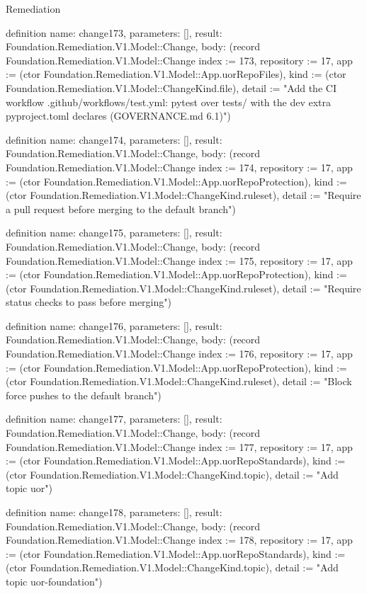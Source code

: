 \begin{lexlean}{Remediation}
\begin{semanticmodule}
definition{
  name: change173,
  parameters: [],
  result: Foundation.Remediation.V1.Model::Change,
  body: (record Foundation.Remediation.V1.Model::Change {index := 173, repository := 17, app := (ctor Foundation.Remediation.V1.Model::App.uorRepoFiles), kind := (ctor Foundation.Remediation.V1.Model::ChangeKind.file), detail := "Add the CI workflow .github/workflows/test.yml: pytest over tests/ with the dev extra pyproject.toml declares (GOVERNANCE.md 6.1)"})
}

definition{
  name: change174,
  parameters: [],
  result: Foundation.Remediation.V1.Model::Change,
  body: (record Foundation.Remediation.V1.Model::Change {index := 174, repository := 17, app := (ctor Foundation.Remediation.V1.Model::App.uorRepoProtection), kind := (ctor Foundation.Remediation.V1.Model::ChangeKind.ruleset), detail := "Require a pull request before merging to the default branch"})
}

definition{
  name: change175,
  parameters: [],
  result: Foundation.Remediation.V1.Model::Change,
  body: (record Foundation.Remediation.V1.Model::Change {index := 175, repository := 17, app := (ctor Foundation.Remediation.V1.Model::App.uorRepoProtection), kind := (ctor Foundation.Remediation.V1.Model::ChangeKind.ruleset), detail := "Require status checks to pass before merging"})
}

definition{
  name: change176,
  parameters: [],
  result: Foundation.Remediation.V1.Model::Change,
  body: (record Foundation.Remediation.V1.Model::Change {index := 176, repository := 17, app := (ctor Foundation.Remediation.V1.Model::App.uorRepoProtection), kind := (ctor Foundation.Remediation.V1.Model::ChangeKind.ruleset), detail := "Block force pushes to the default branch"})
}

definition{
  name: change177,
  parameters: [],
  result: Foundation.Remediation.V1.Model::Change,
  body: (record Foundation.Remediation.V1.Model::Change {index := 177, repository := 17, app := (ctor Foundation.Remediation.V1.Model::App.uorRepoStandards), kind := (ctor Foundation.Remediation.V1.Model::ChangeKind.topic), detail := "Add topic uor"})
}

definition{
  name: change178,
  parameters: [],
  result: Foundation.Remediation.V1.Model::Change,
  body: (record Foundation.Remediation.V1.Model::Change {index := 178, repository := 17, app := (ctor Foundation.Remediation.V1.Model::App.uorRepoStandards), kind := (ctor Foundation.Remediation.V1.Model::ChangeKind.topic), detail := "Add topic uor-foundation"})
}


\end{semanticmodule}
\end{lexlean}
